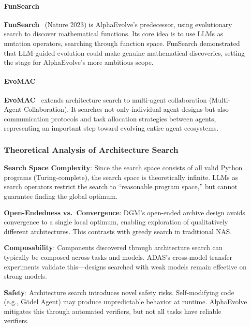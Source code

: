 \paragraph{FunSearch}

\textbf{FunSearch}~\citep{funsearch2024} (Nature 2023) is AlphaEvolve's predecessor, using evolutionary search to discover mathematical functions. Its core idea is to use LLMs as mutation operators, searching through function space. FunSearch demonstrated that LLM-guided evolution could make genuine mathematical discoveries, setting the stage for AlphaEvolve's more ambitious scope.

\paragraph{EvoMAC}

\textbf{EvoMAC}~\citep{evomac2024} extends architecture search to multi-agent collaboration (Multi-Agent Collaboration). It searches not only individual agent designs but also communication protocols and task allocation strategies between agents, representing an important step toward evolving entire agent ecosystems.

\subsubsection{Theoretical Analysis of Architecture Search}

\textbf{Search Space Complexity}: Since the search space consists of all valid Python programs (Turing-complete), the search space is theoretically infinite. LLMs as search operators restrict the search to ``reasonable program space,'' but cannot guarantee finding the global optimum.

\textbf{Open-Endedness vs.\ Convergence}: DGM's open-ended archive design avoids convergence to a single local optimum, enabling exploration of qualitatively different architectures. This contrasts with greedy search in traditional NAS.

\textbf{Composability}: Components discovered through architecture search can typically be composed across tasks and models. ADAS's cross-model transfer experiments validate this---designs searched with weak models remain effective on strong models.

\textbf{Safety}: Architecture search introduces novel safety risks. Self-modifying code (e.g., G\"{o}del Agent) may produce unpredictable behavior at runtime. AlphaEvolve mitigates this through automated verifiers, but not all tasks have reliable verifiers.

